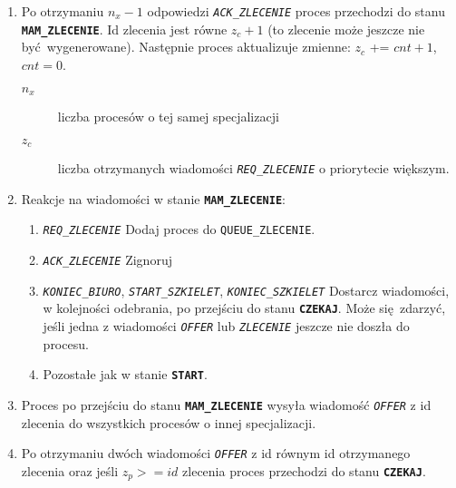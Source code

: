 \documentclass[12pt]{article}
\newcommand{\state}[1]{\texttt{\textbf{#1}}}
\newcommand{\msg}[1]{\texttt{\emph{#1}}}
\newcommand{\var}[1]{\texttt{#1}}
\begin{document}
\begin{enumerate}
	\item Po otrzymaniu $n_x - 1$ odpowiedzi \msg{ACK\_ZLECENIE} proces przechodzi do stanu \state{MAM\_ZLECENIE}. Id zlecenia jest równe $z_c + 1$ (to zlecenie może jeszcze nie być wygenerowane). Następnie proces aktualizuje zmienne: $z_c$ += $cnt + 1$, $cnt = 0$.
	\begin{description}
		\item[$n_x$] liczba procesów o tej samej specjalizacji
		\item[$z_c$] liczba otrzymanych wiadomości \msg{REQ\_ZLECENIE} o priorytecie większym.
	\end{description}
			
	\item Reakcje na wiadomości w stanie \state{MAM\_ZLECENIE}:
	\begin{enumerate}
		\item \msg{REQ\_ZLECENIE} Dodaj proces do \var{QUEUE\_ZLECENIE}.
		\item \msg{ACK\_ZLECENIE} Zignoruj
		\item \msg{KONIEC\_BIURO}, \msg{START\_SZKIELET}, \msg{KONIEC\_SZKIELET} Dostarcz wiadomości, w kolejności odebrania, po przejściu do stanu \state{CZEKAJ}. Może się zdarzyć, jeśli jedna z wiadomości \msg{OFFER} lub \msg{ZLECENIE} jeszcze nie doszła do procesu.
		\item  Pozostałe jak w stanie \state{START}.
	\end{enumerate}
	
	\item Proces po przejściu do stanu \state{MAM\_ZLECENIE} wysyła wiadomość \msg{OFFER} z id zlecenia do wszystkich procesów o innej specjalizacji.
	
	\item Po otrzymaniu dwóch wiadomości \msg{OFFER} z id równym id otrzymanego zlecenia oraz jeśli $z_p >= id$ zlecenia proces przechodzi do stanu \state{CZEKAJ}.
\end{enumerate}
\end{document}

